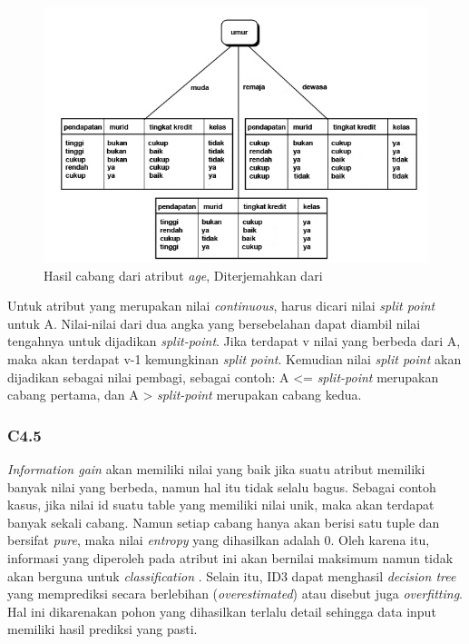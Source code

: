 \begin{figure}
\centering
\includegraphics[scale=1]{Gambar/hasilcabangid3.jpg}
\caption[Hasil pohon faktor pada atribut \textsl{age} dari table 2.1]{Hasil cabang dari atribut \textsl{age}, Diterjemahkan dari \cite{DM}} 
\label{fig:hasilCabang}
\end{figure}

Untuk atribut yang merupakan nilai \textsl{continuous}, harus dicari nilai \textsl{split point} untuk A. Nilai-nilai dari dua angka yang bersebelahan dapat diambil nilai tengahnya untuk dijadikan \textsl{split-point}. Jika terdapat v nilai yang berbeda dari A, maka akan terdapat v-1 kemungkinan \textsl{split point}. Kemudian nilai \textsl{split point} akan dijadikan sebagai nilai pembagi, sebagai contoh: A <= \textsl{split-point} merupakan cabang pertama, dan A > \textsl{split-point} merupakan cabang kedua.

\subsubsection{C4.5}

\textsl{Information gain} akan memiliki nilai yang baik jika suatu atribut memiliki banyak nilai yang berbeda, namun hal itu tidak selalu bagus. Sebagai contoh kasus, jika nilai id suatu table yang memiliki nilai unik, maka akan terdapat banyak sekali cabang. Namun setiap cabang hanya akan berisi satu tuple dan bersifat \textsl{pure}, maka nilai \textsl{entropy} yang dihasilkan adalah 0. Oleh karena itu, informasi yang diperoleh pada atribut ini akan bernilai maksimum namun tidak akan berguna untuk \textsl{classification} \cite{DM}. Selain itu, ID3 dapat menghasil \textsl{decision tree} yang memprediksi secara berlebihan (\textsl{overestimated}) atau disebut juga \textsl{overfitting}. Hal ini dikarenakan pohon yang dihasilkan terlalu detail sehingga data input memiliki hasil prediksi yang pasti. 

